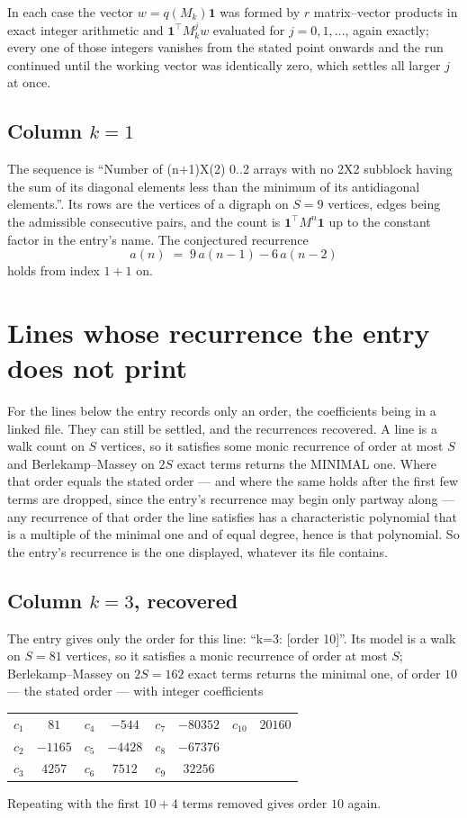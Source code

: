 \documentclass[11pt,a4paper]{article}
\theoremstyle{plain}
\theoremstyle{definition}
\begin{document}
In each case the vector $w=q(M_k)\mathbf{1}$ was formed by $r$ matrix--vector products in
exact integer arithmetic and $\mathbf{1}^{\!\top}M_k^{j}w$ evaluated for $j=0,1,\dots$,
again exactly; every one of those integers vanishes from the stated point onwards and the run
continued until the working vector was identically zero, which settles all larger $j$ at once.

\subsection*{Column $k$$=1$}
The sequence is ``Number of (n+1)X(2) 0..2 arrays with no 2X2 subblock having the sum of its diagonal elements less than the minimum of its antidiagonal elements.''. Its rows are the vertices of a digraph on
$S=9$ vertices, edges being the admissible consecutive pairs, and the count is
$\mathbf{1}^{\!\top}M^{n}\mathbf{1}$ up to the constant factor in the entry's name.
The conjectured recurrence
\[
a(n)\;=\;9\,a(n-1) - 6\,a(n-2)
\]
holds from index $1+1$ on.


\section{Lines whose recurrence the entry does not print}

For the lines below the entry records only an order, the coefficients being in a linked file.
They can still be settled, and the recurrences recovered. A line is a walk count on $S$
vertices, so it satisfies some monic recurrence of order at most $S$ and Berlekamp--Massey on
$2S$ exact terms returns the MINIMAL one. Where that order equals the stated order --- and
where the same holds after the first few terms are dropped, since the entry's recurrence may
begin only partway along --- any recurrence of that order the line satisfies has a
characteristic polynomial that is a multiple of the minimal one and of equal degree, hence is
that polynomial. So the entry's recurrence is the one displayed, whatever its file contains.

\subsection*{Column $k=3$, recovered}
The entry gives only the order for this line: ``k=3: [order 10]''. Its model is a walk on
$S=81$ vertices, so it satisfies a monic recurrence of order at most $S$;
Berlekamp--Massey on $2S=162$ exact terms returns the minimal one, of order
$10$ --- the stated order --- with integer coefficients
\begin{center}\small\begin{tabular}{cccccccc}
$c_{1}$ & $81$ & $c_{4}$ & $-544$ & $c_{7}$ & $-80352$ & $c_{10}$ & $20160$ \\
$c_{2}$ & $-1165$ & $c_{5}$ & $-4428$ & $c_{8}$ & $-67376$ &  &  \\
$c_{3}$ & $4257$ & $c_{6}$ & $7512$ & $c_{9}$ & $32256$ &  &  \\
\end{tabular}\end{center}
Repeating with the first $10+4$ terms removed gives order $10$ again.
\end{document}
